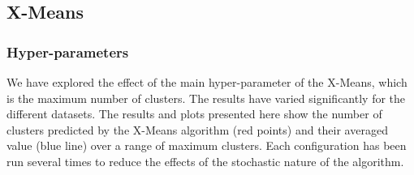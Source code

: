 \subsection{X-Means}
\subsubsection{Hyper-parameters}
We have explored the effect of the main hyper-parameter of the X-Means, which is the maximum number of clusters. The results have varied significantly for the different datasets. The results and plots presented here show the number of clusters predicted by the X-Means algorithm (red points) and their averaged value (blue line) over a range of maximum clusters. Each configuration has been run several times to reduce the effects of the stochastic nature of the algorithm.

